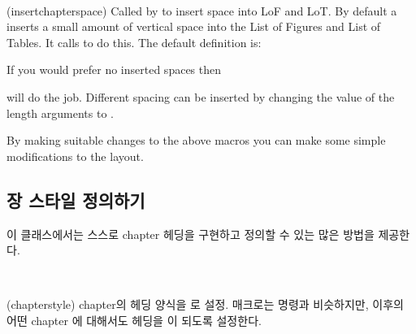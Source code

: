 \begin{syntax}
\cmd{\insertchapterspace} \\
\end{syntax}
\glossary(insertchapterspace)%
  {}%
  {Called by  to insert space into LoF and LoT.}
By default a \cmd{\chapter} inserts a small amount of vertical space
into the List of Figures and List of Tables. It calls \cmd{\insertchapterspace}
to do this. The default definition is:
\begin{lcode}
\newcommand{\insertchapterspace}{%
  \addtocontents{lof}{\protect\addvspace{10pt}}%
  \addtocontents{lot}{\protect\addvspace{10pt}}%
}
\end{lcode}
If you would prefer no inserted spaces then 
\begin{lcode}
\renewcommand{\insertchapterspace}{}
\end{lcode}
will do the job. 
Different spacing can be inserted by
changing the value of the length arguments to \cmd{\addvspace}.

By making suitable changes to the above macros you can make some
simple modifications to the layout.


\subsection{장 스타일 정의하기} \label{sec:chapterstyle}


이 클래스에서는 스스로 chapter 헤딩을 구현하고 정의할 수 있는 많은 방법을 제공한다.

\begin{syntax}
\cmd{\chapterstyle} \\
\end{syntax}
\glossary(chapterstyle)%
  {}%
  {chapter의 헤딩 양식을 로 설정.}
\cmd{\chapterstyle} 매크로는 \cmd{\pagestyle} 명령과 비슷하지만,
이후의 어떤 chapter 에 대해서도 헤딩을 이 되도록 설정한다.

